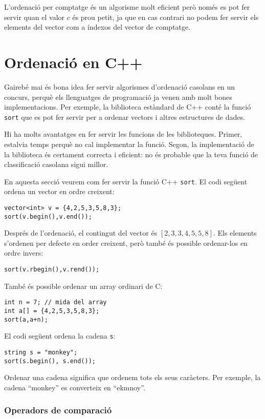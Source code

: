 L'ordenació per comptatge és un algorisme molt eficient
però només es pot fer servir quan el valor $c$
és prou petit, ja que en cas contrari no podem fer servir els
elements del vector com a índexos del vector de comptatge.

\section{Ordenació en C++}


Gairebé mai és bona idea fer servir
algorismes d'ordenació casolans
en un concurs, perquè els llenguatges de programació
ja venen amb molt bones implementacions.
Per exemple, la biblioteca estàndard de C++ conté
la funció \texttt{sort} que es pot fer servir per a ordenar
vectors i altres estructures de dades.

Hi ha molts avantatges en fer servir les funcions de les biblioteques.
Primer, estalvia temps perquè no cal implementar la funció.
Segon, la implementació de la biblioteca és
certament correcta i eficient: no és probable
que la teva funció de classificació casolana sigui millor.

En aquesta secció veurem com fer servir la
funció C++ \texttt{sort}.
El codi següent ordena
un vector en ordre creixent:
\begin{lstlisting}
vector<int> v = {4,2,5,3,5,8,3};
sort(v.begin(),v.end());
\end{lstlisting}
Després de l'ordenació, el contingut del
vector és
$[2,3,3,4,5,5,8]$.
Els elements s'ordenen per defecte en order creixent,
però també és possible ordenar-los en ordre invers:
\begin{lstlisting}
sort(v.rbegin(),v.rend());
\end{lstlisting}
També és possible ordenar un array ordinari de C:
\begin{lstlisting}
int n = 7; // mida del array
int a[] = {4,2,5,3,5,8,3};
sort(a,a+n);
\end{lstlisting}

El codi següent ordena la cadena \texttt{s}:
\begin{lstlisting}
string s = "monkey";
sort(s.begin(), s.end());
\end{lstlisting}
Ordenar una cadena significa que ordenem tots
els seus caràcters.
Per exemple, la cadena ``monkey'' es converteix en ``ekmnoy''.

\subsubsection{Operadors de comparació}


